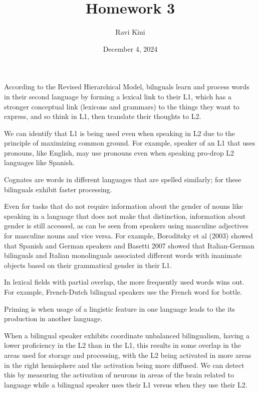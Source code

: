 \documentclass{article}
\title{Homework 3}
\author{Ravi Kini}
\date{December 4, 2024}
\begin{document}
\maketitle

\problem
According to the Revised Hierarchical Model, bilnguals learn and process words in their second language by forming a lexical link to their L1, which has a stronger conceptual link (lexicons and grammars) to the things they want to express, and so think in L1, then translate their thoughts to L2.

\clearpage

\problem
We can identify that L1 is being used even when speaking in L2 due to the principle of maximizing common ground. For example, speaker of an L1 that uses pronouns, like English, may use pronouns even when speaking pro-drop L2 languages like Spanish.

\clearpage

\problem
Cognates are words in different languages that are spelled similarly; for these bilinguals exhibit faster processing.

\clearpage

\problem
Even for tasks that do not require information about the gender of nouns like speaking in a language that does not make that distinction, information about gender is still accessed, as can be seen from speakers using masculine adjectives for masculine nouns and vice versa. For example, Boroditsky et al (2003) showed that Spanish and German speakers and Basetti 2007 showed that Italian-German bilinguals and Italian monolinguals associated different words with inanimate objects based on their grammatical gender in their L1.


\clearpage

\problem
In lexical fields with partial overlap, the more frequently used words wins out. For example, French-Dutch bilingual speakers use the French word for bottle.

\clearpage

\problem
Priming is when usage of a lingistic feature in one language leads to the its production in another language. 

\clearpage

\problem
When a bilingual speaker exhibits coordinate unbalanced bilingualism, having a lower proficiency in the L2 than in the L1, this results in some overlap in the areas used for storage and processing, with the L2 being activated in more areas in the right hemisphere and the activation being more diffused. We can detect this by measuring the activation of neurons in areas of the brain related to language while a bilingual speaker uses their L1 versus when they use their L2.
\end{document}
